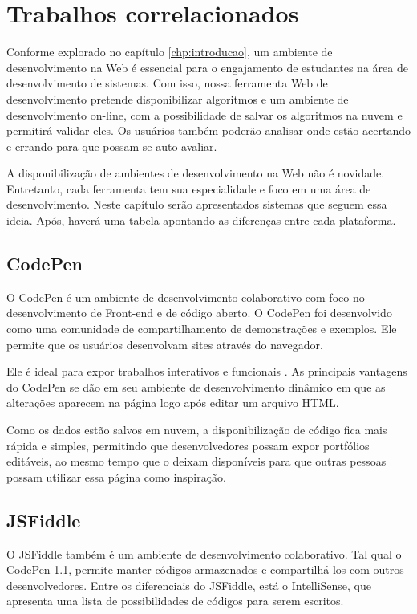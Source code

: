 \chapter{Trabalhos correlacionados}
\label{chp:conceitos-gerais}
Conforme explorado no capítulo \ref{chp:introducao}, um ambiente de desenvolvimento na Web é essencial para o engajamento de estudantes na área de desenvolvimento de sistemas. Com isso, nossa ferramenta Web de desenvolvimento pretende disponibilizar algoritmos e um ambiente de desenvolvimento on-line, com a possibilidade de salvar os algoritmos na nuvem e permitirá validar eles. Os usuários também poderão analisar onde estão acertando e errando para que possam se auto-avaliar.

A disponibilização de ambientes de desenvolvimento na Web não é novidade. Entretanto, cada ferramenta tem sua especialidade e foco em uma área de desenvolvimento. Neste capítulo serão apresentados sistemas que seguem essa ideia. Após, haverá uma tabela apontando as diferenças entre cada plataforma.

\section{CodePen}
\label{sec:codepen}
O CodePen é um ambiente de desenvolvimento colaborativo com foco no desenvolvimento de Front-end e de código aberto. O CodePen foi desenvolvido como uma comunidade de compartilhamento de demonstrações e exemplos. Ele permite que os usuários desenvolvam sites através do navegador. 

Ele é ideal para expor trabalhos interativos e funcionais \cite{fiala2016collaborative}. As principais vantagens do CodePen se dão em seu ambiente de desenvolvimento dinâmico em que as alterações aparecem na página logo após editar um arquivo HTML.

Como os dados estão salvos em nuvem, a disponibilização de código fica mais rápida e simples, permitindo que desenvolvedores possam expor portfólios editáveis, ao mesmo tempo que o deixam disponíveis para que outras pessoas possam utilizar essa página como inspiração.

\section{JSFiddle}
\label{sec:jsfiddle}
O JSFiddle também é um ambiente de desenvolvimento colaborativo. Tal qual o CodePen \ref{sec:codepen}, permite manter códigos armazenados e compartilhá-los com outros desenvolvedores. Entre os diferenciais do JSFiddle, está o IntelliSense, que apresenta uma lista de possibilidades de códigos para serem escritos.

